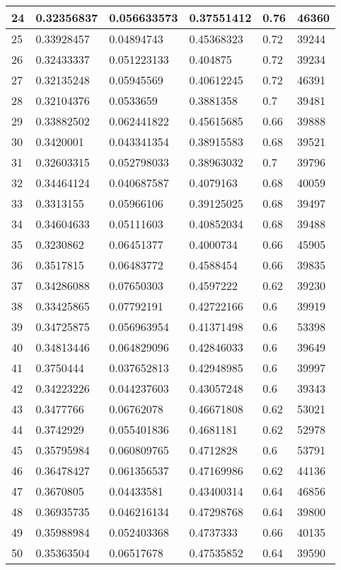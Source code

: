 \begin{longtable}{|l|l|l|l|l|l|}
24 & 0.32356837 & 0.056633573 & 0.37551412 & 0.76 & 46360 \\ \hline 
25 & 0.33928457 & 0.04894743 & 0.45368323 & 0.72 & 39244 \\ \hline 
26 & 0.32433337 & 0.051223133 & 0.404875 & 0.72 & 39234 \\ \hline 
27 & 0.32135248 & 0.05945569 & 0.40612245 & 0.72 & 46391 \\ \hline 
28 & 0.32104376 & 0.0533659 & 0.3881358 & 0.7 & 39481 \\ \hline 
29 & 0.33882502 & 0.062441822 & 0.45615685 & 0.66 & 39888 \\ \hline 
30 & 0.3420001 & 0.043341354 & 0.38915583 & 0.68 & 39521 \\ \hline 
31 & 0.32603315 & 0.052798033 & 0.38963032 & 0.7 & 39796 \\ \hline 
32 & 0.34464124 & 0.040687587 & 0.4079163 & 0.68 & 40059 \\ \hline 
33 & 0.3313155 & 0.05966106 & 0.39125025 & 0.68 & 39497 \\ \hline 
34 & 0.34604633 & 0.05111603 & 0.40852034 & 0.68 & 39488 \\ \hline 
35 & 0.3230862 & 0.06451377 & 0.4000734 & 0.66 & 45905 \\ \hline 
36 & 0.3517815 & 0.06483772 & 0.4588454 & 0.66 & 39835 \\ \hline 
37 & 0.34286088 & 0.07650303 & 0.4597222 & 0.62 & 39230 \\ \hline 
38 & 0.33425865 & 0.07792191 & 0.42722166 & 0.6 & 39919 \\ \hline 
39 & 0.34725875 & 0.056963954 & 0.41371498 & 0.6 & 53398 \\ \hline 
40 & 0.34813446 & 0.064829096 & 0.42846033 & 0.6 & 39649 \\ \hline 
41 & 0.3750444 & 0.037652813 & 0.42948985 & 0.6 & 39997 \\ \hline 
42 & 0.34223226 & 0.044237603 & 0.43057248 & 0.6 & 39343 \\ \hline 
43 & 0.3477766 & 0.06762078 & 0.46671808 & 0.62 & 53021 \\ \hline 
44 & 0.3742929 & 0.055401836 & 0.4681181 & 0.62 & 52978 \\ \hline 
45 & 0.35795984 & 0.060809765 & 0.4712828 & 0.6 & 53791 \\ \hline 
46 & 0.36478427 & 0.061356537 & 0.47169986 & 0.62 & 44136 \\ \hline 
47 & 0.3670805 & 0.04433581 & 0.43400314 & 0.64 & 46856 \\ \hline 
48 & 0.36935735 & 0.046216134 & 0.47298768 & 0.64 & 39800 \\ \hline 
49 & 0.35988984 & 0.052403368 & 0.4737333 & 0.66 & 40135 \\ \hline 
50 & 0.35363504 & 0.06517678 & 0.47535852 & 0.64 & 39590 \\ \hline 
\end{longtable}